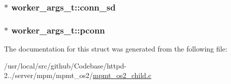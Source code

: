 \subsubsection[{\texorpdfstring{conn\+\_\+sd}{conn_sd}}]{$\ast$ worker\+\_\+args\+\_\+t\+::conn\+\_\+sd}\hypertarget{structworker__args__t_afeb0abf3febce8e8f6e794be55b8a0b2}{}\label{structworker__args__t_afeb0abf3febce8e8f6e794be55b8a0b2}
\subsubsection[{\texorpdfstring{pconn}{pconn}}]{$\ast$ worker\+\_\+args\+\_\+t\+::pconn}\hypertarget{structworker__args__t_a6f72d346f84cadc4a59adadd0d18cf9b}{}\label{structworker__args__t_a6f72d346f84cadc4a59adadd0d18cf9b}


The documentation for this struct was generated from the following file\+:\begin{DoxyCompactItemize}
\item 
/usr/local/src/github/\+Codebase/httpd-\/2../server/mpm/mpmt\+\_\+os2/\hyperlink{mpmt__os2__child_8c}{mpmt\+\_\+os2\+\_\+child.\+c}\end{DoxyCompactItemize}
